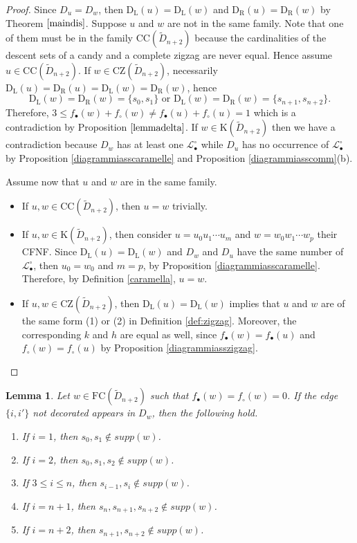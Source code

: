 \documentclass{amsart}
\newcommand{\D}{{\widetilde{D}_{n+2}}}
\newcommand{\ld}{{\mathrm{D}_{\mathrm{L}}}}
\newcommand{\rd}{{\mathrm{D}_{\mathrm{R}}}}
\newcommand{\fc}{{\mathrm{FC}}}
\newcommand{\bwO}{{\mathcal{L}_{\bullet}^{\circ}}}
\newcommand{\TTC}{\mathrm{CC}}
\newcommand{\zz}{\mathrm{CZ}}
\newcommand{\car}{\mathrm{K}}
\newtheorem{Lemma}[Theorem]{Lemma}
\theoremstyle{definition}
\begin{document}
\begin{proof}
Since $D_u=D_w$, then $\ld(u)=\ld(w)$ and $\rd(u)=\rd(w)$ by Theorem $\ref{maindis}$. Suppose $u$ and $w$ are not in the same family. Note that one of them must be in the family $\TTC(\D)$ because the cardinalities of the descent sets of a candy and a complete zigzag are never equal. Hence assume $u\in \TTC(\D)$. If $w\in \zz(\D)$, necessarily $\ld(u)=\rd(u)=\ld(w)=\rd(w)$, hence \[\ld(w)=\rd(w)=\{s_0,s_1\}\mbox{ or }\ld(w)=\rd(w)=\{s_{n+1},s_{n+2}\}.\]
Therefore,  $3\le f_\bullet(w)+f_\circ(w)\ne f_\bullet(u)+f_\circ(u)=1$ which is a contradiction by Proposition $\ref{lemmadelta}$. If $w\in \car(\D)$ then we have a contradiction because $D_w$ has at least one $\bwO$ while $D_u$ has no occurrence of $\bwO$ by Proposition \ref{diagrammiasscaramelle} and Proposition \ref{diagrammiasscomm}(b). 


Assume now that $u$ and $w$ are in the same family.
\begin{itemize}
    \item If $u,w\in \TTC(\D)$, then $u=w$ trivially.
    \item If $u,w\in \car(\D)$, then consider $u=u_0u_1\cdots u_m$ and $w=w_0w_1\cdots w_p$ their CFNF. Since $\ld(u)=\ld(w)$ and $D_w$ and $D_u$ have the same number of $\bwO$, then $u_0=w_0$ and $m=p$, by Proposition \ref{diagrammiasscaramelle}. Therefore, by Definition \ref{caramella}, $u=w$.
    \item If $u,w\in \zz(\D)$, then $\ld(u)=\ld(w)$ implies that $u$ and $w$ are of the same form (1) or (2) in Definition \ref{def:zigzag}. Moreover, the corresponding $k$ and $h$ are equal as well, since $f_\bullet(w)=f_\bullet(u)$ and $f_\circ(w)=f_\circ(u)$ by Proposition \ref{diagrammiasszigzag}.
\end{itemize}
\end{proof}

\begin{Lemma}
\label{lemmadiagcommuno}
Let $w\in \fc(\D)$ such that $f_\bullet(w)=f_\circ(w)=0$. If the edge $\{i,i'\}$ not decorated appears in $D_w$, then the following hold.
\begin{enumerate}
    \item[(a)] If $i=1$, then $s_0,s_1\notin supp(w)$.
    \item[(b)] If $i=2$, then $s_0,s_1,s_2\notin supp(w)$.
    \item[(c)] If $3\le i\le n$, then $s_{i-1},s_i\notin supp(w)$.
    \item[(d)] If $i=n+1$, then $s_{n},s_{n+1},s_{n+2}\notin supp(w)$.
    \item[(e)] If $i=n+2$, then $s_{n+1},s_{n+2}\notin supp(w)$.
\end{enumerate}
\end{Lemma}
\end{document}
